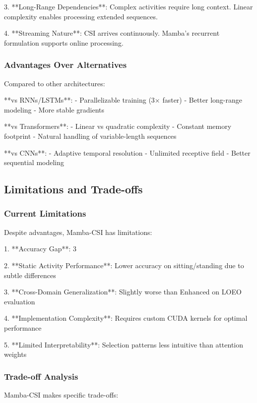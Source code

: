 \documentclass[10pt,journal,compsoc]{IEEEtran}
\begin{document}
3. **Long-Range Dependencies**: Complex activities require long context. Linear complexity enables processing extended sequences.

4. **Streaming Nature**: CSI arrives continuously. Mamba's recurrent formulation supports online processing.

\subsubsection{Advantages Over Alternatives}

Compared to other architectures:

**vs RNNs/LSTMs**:
- Parallelizable training (3× faster)
- Better long-range modeling
- More stable gradients

**vs Transformers**:
- Linear vs quadratic complexity
- Constant memory footprint
- Natural handling of variable-length sequences

**vs CNNs**:
- Adaptive temporal resolution
- Unlimited receptive field
- Better sequential modeling

\subsection{Limitations and Trade-offs}

\subsubsection{Current Limitations}

Despite advantages, Mamba-CSI has limitations:

1. **Accuracy Gap**: 3%

2. **Static Activity Performance**: Lower accuracy on sitting/standing due to subtle differences

3. **Cross-Domain Generalization**: Slightly worse than Enhanced on LOEO evaluation

4. **Implementation Complexity**: Requires custom CUDA kernels for optimal performance

5. **Limited Interpretability**: Selection patterns less intuitive than attention weights

\subsubsection{Trade-off Analysis}

Mamba-CSI makes specific trade-offs:
\end{document}
